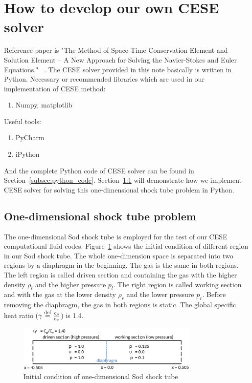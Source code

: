 \documentclass[a4paper,12pt]{article}
\begin{document}
\section{How to develop our own CESE solver}
 \label{sec:development_cese}
Reference paper is "The Method of Space-Time Conservation Element and Solution 
Element -- A New Approach for Solving the Navier-Stokes and Euler Equations."
~\cite{CESE_Shin_Chung_Chang_1995}. The CESE solver provided in this note 
basically is written in Python.
Necessary or recommended libraries which are used in our implementation of CESE 
method: 
 \begin{enumerate}
  \item Numpy, matplotlib
 \end{enumerate}
Useful tools:
 \begin{enumerate}
  \item PyCharm
  \item iPython
 \end{enumerate}
And the complete Python code of CESE solver can be found in 
Section~\ref{subsec:python_code}. Section~\ref{sec:1d_shock_tube} will 
demonstrate how we implement CESE solver for solving this one-dimensional 
shock tube problem in Python.

\subsection{One-dimensional shock tube problem}
 \label{sec:1d_shock_tube}
The one-dimensional Sod shock tube is employed for the test of our CESE 
computational fluid codes. Figure~\ref{fig:sod_shock_tube_1D} shows the 
initial condition of different region in our Sod shock tube. The whole 
one-dimension space is separated into two regions by a diaphragm in the 
beginning. The gas is the same in both regions. The left region is called 
driven section and containing the gas with the higher density $\rho_l$ and 
the higher pressure $p_l$. The right region is called working section and 
with the gas at the lower density $\rho_r$ and the lower pressure $p_r$. 
Before removing the diaphragm, the gas in both regions is static. The global 
specific heat ratio ($\gamma\buildrel{\text{def}}\over{=}\frac{c_p}{c_v}$) 
is 1.4.

 \begin{figure}[hbtp]
    \centering
     \includegraphics[width=0.8\textwidth]{sod_shock_tube_1D.eps}
     \caption{Initial condition of one-dimensional Sod shock tube}
     \label{fig:sod_shock_tube_1D}
 \end{figure}
\end{document}
